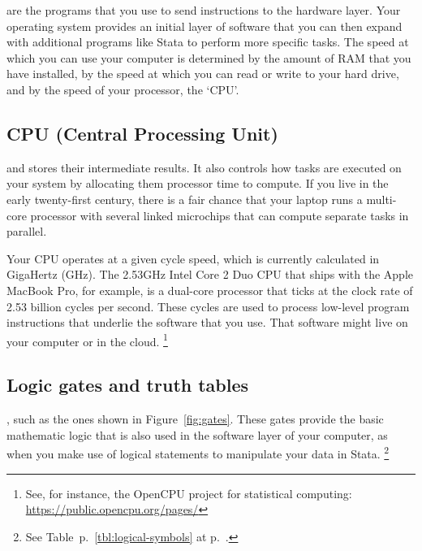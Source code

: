  are the programs that you use to send instructions to the hardware layer. Your operating system provides an initial layer of software that you can then expand with additional programs like Stata to perform more specific tasks. The speed at which you can use your computer is determined by the amount of RAM that you have installed, by the speed at which you can read or write to your hard drive, and by the speed of your processor, the `CPU'.%

%
\subsection{CPU (Central Processing Unit)}%

 and stores their intermediate results. It also controls how tasks are executed on your system by allocating them processor time to compute. If you live in the early twenty-first century, there is a fair chance that your laptop runs a multi-core processor with several linked microchips that can compute separate tasks in parallel.%

Your CPU operates at a given cycle speed, which is currently calculated in GigaHertz (GHz). The 2.53GHz Intel Core 2 Duo CPU that ships with the Apple MacBook Pro, for example, is a dual-core processor that ticks at the clock rate of 2.53 billion cycles per second. These cycles are used to process low-level program instructions that underlie the software that you use. That software might live on your computer or in the cloud.%
  \footnote{See, for instance, the OpenCPU project for statistical computing: \url{https://public.opencpu.org/pages/}}%

%
\subsection{Logic gates and truth tables}%
	
, such as the ones shown in Figure~\ref{fig:gates}. These gates provide the basic mathematic logic that is also used in the software layer of your computer, as when you make use of logical statements to manipulate your data in Stata.%
  \footnote{See Table~p.~\ref{tbl:logical-symbols} at p.~\pageref{tbl:logical-symbols}.}%


